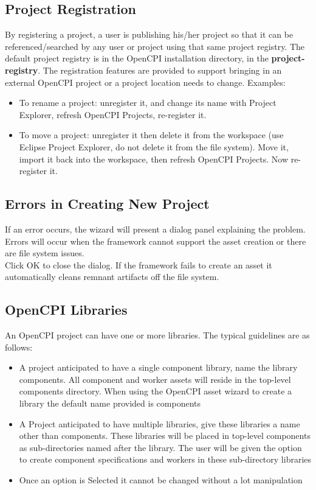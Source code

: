 \subsection{Project Registration}
By registering a project, a user is publishing his/her project so that it can be referenced/searched by any user or project using that same project registry. The default project registry is in the OpenCPI installation directory, in the \textbf{ project-registry}. The registration features are provided to support bringing in an external OpenCPI project or a project location needs to change.
Examples:
\begin{itemize}
\item	To rename a project: unregister it, and change its name with Project Explorer, refresh OpenCPI Projects, re-register it.
\item	To move a project: unregister it then delete it from the workspace (use Eclipse Project Explorer, do not delete it from the file system). Move it, import it back into the workspace, then refresh OpenCPI Projects. Now re-register it.
\end{itemize}
\subsection{Errors in Creating New Project}
If an error occurs, the wizard will present a dialog panel explaining the problem. Errors will occur when the framework cannot support the asset creation or there are file system issues. \\

Click OK to close the dialog. If the framework fails to create an asset it automatically cleans remnant artifacts off the file system.
\subsection{OpenCPI Libraries}
An OpenCPI project can have one or more libraries. The typical guidelines are as follows:
\begin{itemize}
\item A project anticipated to have a single component library, name the library components. All component and worker assets will reside in the top-level components directory. When using the OpenCPI asset wizard to create a library the default name provided is components
\item A Project anticipated to have multiple libraries, give these libraries a name other than components. These libraries will be placed in top-level components as sub-directories named after the library. The user will be given the option to create component specifications and workers in these sub-directory libraries
\item Once an option is Selected it cannot be changed without a lot manipulation
\end{itemize}
